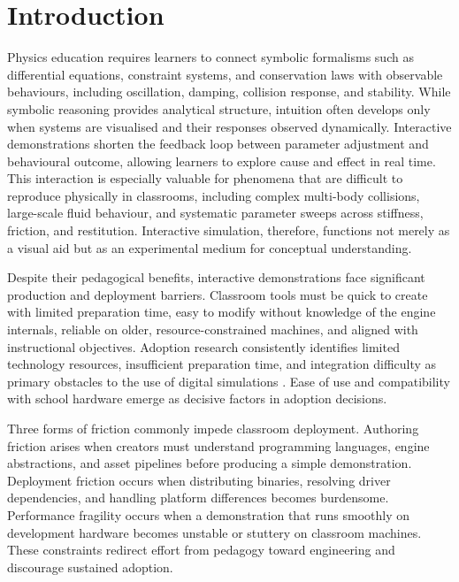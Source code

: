 \documentclass[9pt,openany]{extbook}
\begin{document}
\clearpage

\tableofcontents
\clearpage

\setcounter{page}{1}
\chapter{Introduction}

Physics education requires learners to connect symbolic formalisms such as differential equations, constraint systems, and conservation laws with observable behaviours, including oscillation, damping, collision response, and stability. While symbolic reasoning provides analytical structure, intuition often develops only when systems are visualised and their responses observed dynamically. Interactive demonstrations shorten the feedback loop between parameter adjustment and behavioural outcome, allowing learners to explore cause and effect in real time. This interaction is especially valuable for phenomena that are difficult to reproduce physically in classrooms, including complex multi-body collisions, large-scale fluid behaviour, and systematic parameter sweeps across stiffness, friction, and restitution. Interactive simulation, therefore, functions not merely as a visual aid but as an experimental medium for conceptual understanding.

Despite their pedagogical benefits, interactive demonstrations face significant production and deployment barriers. Classroom tools must be quick to create with limited preparation time, easy to modify without knowledge of the engine internals, reliable on older, resource-constrained machines, and aligned with instructional objectives. Adoption research consistently identifies limited technology resources, insufficient preparation time, and integration difficulty as primary obstacles to the use of digital simulations \cite{an2016games, kaimara2021dgbla}. Ease of use and compatibility with school hardware emerge as decisive factors in adoption decisions.

Three forms of friction commonly impede classroom deployment. Authoring friction arises when creators must understand programming languages, engine abstractions, and asset pipelines before producing a simple demonstration. Deployment friction occurs when distributing binaries, resolving driver dependencies, and handling platform differences becomes burdensome. Performance fragility occurs when a demonstration that runs smoothly on development hardware becomes unstable or stuttery on classroom machines. These constraints redirect effort from pedagogy toward engineering and discourage sustained adoption.
\end{document}
